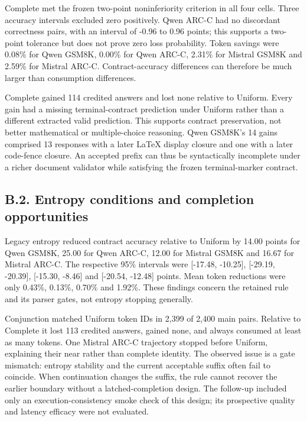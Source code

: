 \documentclass[
  12pt,
  a4paper,
]{article}
\begin{document}
Complete met the frozen two-point noninferiority criterion in all four
cells. Three accuracy intervals excluded zero positively. Qwen ARC-C had
no discordant correctness pairs, with an interval of -0.96 to 0.96
points; this supports a two-point tolerance but does not prove zero loss
probability. Token savings were 0.08\% for Qwen GSM8K, 0.00\% for Qwen
ARC-C, 2.31\% for Mistral GSM8K and 2.59\% for Mistral ARC-C.
Contract-accuracy differences can therefore be much larger than
consumption differences.

Complete gained 114 credited answers and lost none relative to Uniform.
Every gain had a missing terminal-contract prediction under Uniform
rather than a different extracted valid prediction. This supports
contract preservation, not better mathematical or multiple-choice
reasoning. Qwen GSM8K's 14 gains comprised 13 responses with a later
LaTeX display closure and one with a later code-fence closure. An
accepted prefix can thus be syntactically incomplete under a richer
document validator while satisfying the frozen terminal-marker contract.

\subsection{B.2. Entropy conditions and completion
opportunities}\label{b.2.-entropy-conditions-and-completion-opportunities}

Legacy entropy reduced contract accuracy relative to Uniform by 14.00
points for Qwen GSM8K, 25.00 for Qwen ARC-C, 12.00 for Mistral GSM8K and
16.67 for Mistral ARC-C. The respective 95\% intervals were {[}-17.48,
-10.25{]}, {[}-29.19, -20.39{]}, {[}-15.30, -8.46{]} and {[}-20.54,
-12.48{]} points. Mean token reductions were only 0.43\%, 0.13\%, 0.70\%
and 1.92\%. These findings concern the retained rule and its parser
gates, not entropy stopping generally.

Conjunction matched Uniform token IDs in 2,399 of 2,400 main pairs.
Relative to Complete it lost 113 credited answers, gained none, and
always consumed at least as many tokens. One Mistral ARC-C trajectory
stopped before Uniform, explaining their near rather than complete
identity. The observed issue is a gate mismatch: entropy stability and
the current acceptable suffix often fail to coincide. When continuation
changes the suffix, the rule cannot recover the earlier boundary without
a latched-completion design. The follow-up included only an
execution-consistency smoke check of this design; its prospective
quality and latency efficacy were not evaluated.
\end{document}
